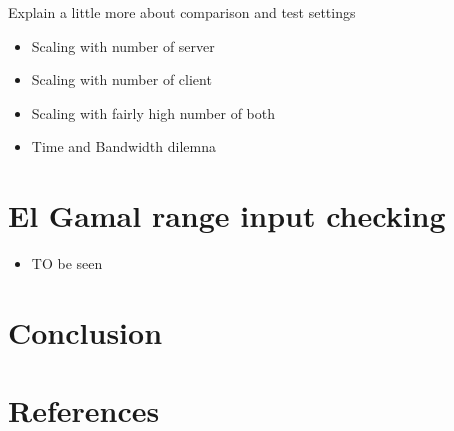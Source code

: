 \documentclass{article}
\begin{document}
Explain a little more about comparison and test settings


\begin{itemize}


\item Scaling with number of server
\item Scaling with number of client
\item Scaling with fairly high number of both 
\item Time and Bandwidth dilemna

\end{itemize}
\section*{El Gamal range input checking}
\begin{itemize}

\item TO be seen
\end{itemize}
\appendix
\newpage

\newpage
\section*{Conclusion}

\newpage
\section*{References}
\end{document}
